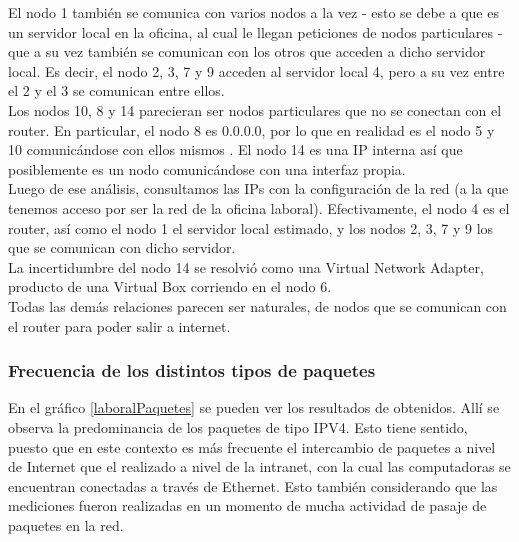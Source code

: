 El nodo 1 tambi\'en se comunica con varios nodos a la vez - esto se debe a que es un servidor local en la oficina, al cual le llegan peticiones de nodos particulares - que a su vez tambi\'en se comunican con los otros que acceden a dicho servidor local. Es decir, el nodo 2, 3, 7 y 9 acceden al servidor local 4, pero a su vez entre el 2 y el 3 se comunican entre ellos.\\

Los nodos 10, 8 y 14 parecieran ser nodos particulares que no se conectan con el router. En particular, el nodo 8 es 0.0.0.0, por lo que en realidad es el nodo 5 y 10 comunic\'andose con ellos mismos . El nodo 14 es una IP interna as\'i que posiblemente es un nodo comunic\'andose con una interfaz propia.\\

Luego de ese an\'alisis, consultamos las IPs con la configuraci\'on de la red (a la que tenemos acceso por ser la red de la oficina laboral). Efectivamente, el nodo 4 es el router, as\'i como el nodo 1 el servidor local estimado, y los nodos 2, 3, 7 y 9 los que se comunican con dicho servidor.\\

La incertidumbre del nodo 14 se resolvi\'o como una Virtual Network Adapter, producto de una Virtual Box corriendo en el nodo 6.\\

Todas las dem\'as relaciones parecen ser naturales, de nodos que se comunican con el router para poder salir a internet.\\

\subsubsection{Frecuencia de los distintos tipos de paquetes}

En el gr\'afico \ref{laboralPaquetes} se pueden ver los resultados de obtenidos. All\'i se observa la predominancia de los paquetes de tipo IPV4. Esto tiene sentido, puesto que en este contexto es m\'as frecuente el intercambio de paquetes a nivel de Internet que el realizado a nivel de la intranet, con la cual las computadoras se encuentran conectadas a trav\'es de Ethernet. Esto tambi\'en considerando que las mediciones fueron realizadas en un momento de mucha actividad de pasaje de paquetes en la red.\\


